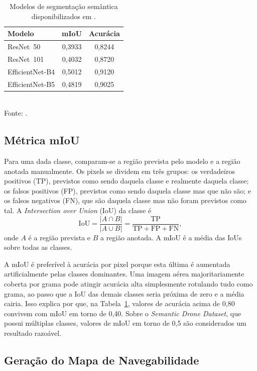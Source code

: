 \documentclass[
    12pt,
    openright,
    oneside,
    a4paper,
    english,
    brazil
]{abntex2}
\begin{document}
\begin{table}[H]
    \centering
    \caption{Modelos de segmentação semântica disponibilizados em \cite{junior2024_models}.}
    \label{tab:modelos_segmentacao}
    \begin{tabular}{lcc}
        \toprule
        \textbf{Modelo} & \textbf{mIoU} & \textbf{Acurácia} \\
        \midrule
        ResNet~50        & 0,3933 & 0,8244 \\
        ResNet~101       & 0,4032 & 0,8720 \\
        EfficientNet-B4  & 0,5012 & 0,9120 \\
        EfficientNet-B5  & 0,4819 & 0,9025 \\
        \bottomrule
    \end{tabular}
    \\[0.3em]
    \footnotesize Fonte: \cite{junior2024_models}.
\end{table}

\subsection{Métrica mIoU}
\label{sec:miou}

Para uma dada classe, comparam-se a região prevista pelo modelo e a região anotada manualmente. Os pixels se dividem em três grupos: os verdadeiros positivos (TP), previstos como sendo daquela classe e realmente daquela classe; os falsos positivos (FP), previstos como sendo daquela classe mas que não são; e os falsos negativos (FN), que são daquela classe mas não foram previstos como tal. A \emph{Intersection over Union} (IoU) da classe é
\[
\mathrm{IoU} = \frac{|A \cap B|}{|A \cup B|} = \frac{\mathrm{TP}}{\mathrm{TP} + \mathrm{FP} + \mathrm{FN}},
\]
onde $A$ é a região prevista e $B$ a região anotada. A mIoU é a média das IoUs sobre todas as classes.

A mIoU é preferível à acurácia por pixel porque esta última é aumentada artificialmente pelas classes dominantes. Uma imagem aérea majoritariamente coberta por grama pode atingir acurácia alta simplesmente rotulando tudo como grama, ao passo que a IoU das demais classes seria próxima de zero e a média cairia. Isso explica por que, na Tabela~\ref{tab:modelos_segmentacao}, valores de acurácia acima de 0,80 convivem com mIoU em torno de 0,40. Sobre o \emph{Semantic Drone Dataset}, que possui múltiplas classes, valores de mIoU em torno de 0,5 são considerados um resultado razoável.

\subsection{Geração do Mapa de Navegabilidade}
\label{sec:mapa_navegabilidade}
\end{document}
